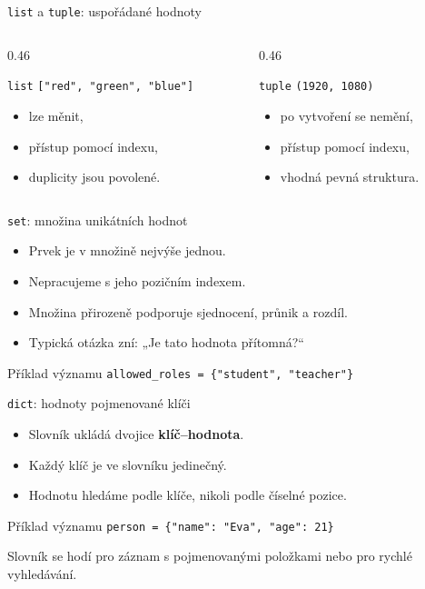 \documentclass[aspectratio=169]{beamer}
\newcommand{\term}[1]{\textcolor{CodeBlue}{\textbf{#1}}}
\begin{document}
\begin{frame}{\texttt{list} a \texttt{tuple}: uspořádané hodnoty}
  \begin{columns}[T]
    \begin{column}{0.46\textwidth}
      \begin{block}{\texttt{list}}
        \texttt{["red", "green", "blue"]}
      \end{block}
      \begin{itemize}
        \item lze měnit,
        \item přístup pomocí indexu,
        \item duplicity jsou povolené.
      \end{itemize}
    \end{column}
    \begin{column}{0.46\textwidth}
      \begin{block}{\texttt{tuple}}
        \texttt{(1920, 1080)}
      \end{block}
      \begin{itemize}
        \item po vytvoření se nemění,
        \item přístup pomocí indexu,
        \item vhodná pevná struktura.
      \end{itemize}
    \end{column}
  \end{columns}
\end{frame}

\begin{frame}{\texttt{set}: množina unikátních hodnot}
  \begin{itemize}
    \item Prvek je v množině nejvýše jednou.
    \item Nepracujeme s jeho pozičním indexem.
    \item Množina přirozeně podporuje sjednocení, průnik a rozdíl.
    \item Typická otázka zní: „Je tato hodnota přítomná?“
  \end{itemize}
  \begin{block}{Příklad významu}
    \texttt{allowed\_roles = \{"student", "teacher"\}}
  \end{block}
\end{frame}

\begin{frame}{\texttt{dict}: hodnoty pojmenované klíči}
  \begin{itemize}
    \item Slovník ukládá dvojice \term{klíč--hodnota}.
    \item Každý klíč je ve slovníku jedinečný.
    \item Hodnotu hledáme podle klíče, nikoli podle číselné pozice.
  \end{itemize}
  \begin{block}{Příklad významu}
    \texttt{person = \{"name": "Eva", "age": 21\}}
  \end{block}
  Slovník se hodí pro záznam s pojmenovanými položkami nebo pro rychlé vyhledávání.
\end{frame}
\end{document}
